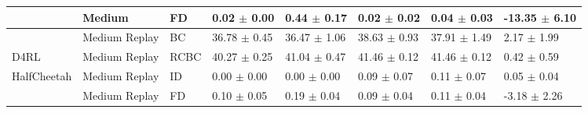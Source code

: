 \begin{table*}
\begin{tabular}{l l l l l l l l}
            &        Medium &   FD &  0.02 $\pm$ 0.00 &  0.44 $\pm$ 0.17 &   0.02 $\pm$ 0.02 &   0.04 $\pm$ 0.03 &  \textcolor[rgb]{0.00,1.00,0.00}{-13.35 $\pm$ 6.10} \\
    \midrule
            & Medium Replay &   BC & 36.78 $\pm$ 0.45 & 36.47 $\pm$ 1.06 &  38.63 $\pm$ 0.93 &  37.91 $\pm$ 1.49 &       \textcolor[rgb]{0.0,1.0,0.0}{2.17 $\pm$ 1.99} \\
       D4RL & Medium Replay & RCBC & 40.27 $\pm$ 0.25 & 41.04 $\pm$ 0.47 &  41.46 $\pm$ 0.12 &  41.46 $\pm$ 0.12 &    \textcolor[rgb]{0.00,0.50,0.00}{0.42 $\pm$ 0.59} \\
HalfCheetah & Medium Replay &   ID &  0.00 $\pm$ 0.00 &  0.00 $\pm$ 0.00 &   0.09 $\pm$ 0.07 &   0.11 $\pm$ 0.07 &    \textcolor[rgb]{0.00,0.00,0.00}{0.05 $\pm$ 0.04} \\
            & Medium Replay &   FD &  0.10 $\pm$ 0.05 &  0.19 $\pm$ 0.04 &   0.09 $\pm$ 0.04 &   0.11 $\pm$ 0.04 &   \textcolor[rgb]{0.00,1.00,0.00}{-3.18 $\pm$ 2.26} \\
    \midrule
    \bottomrule
  \end{tabular}
\end{table*}
